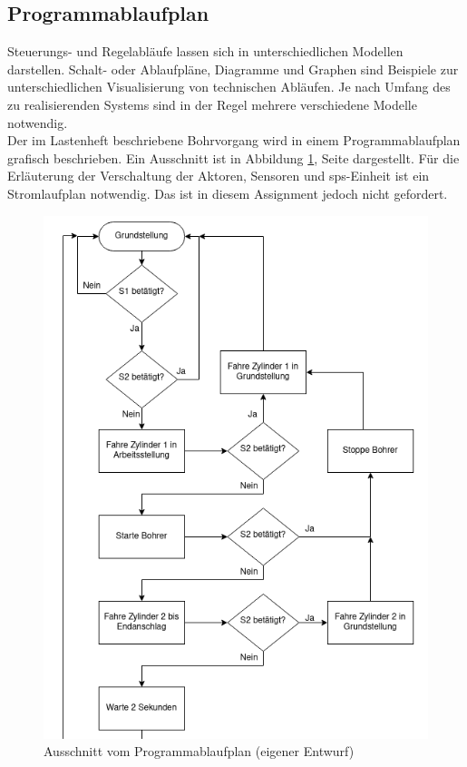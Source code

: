 \subsection{Programmablaufplan}
Steuerungs- und Regelabläufe lassen sich in unterschiedlichen Modellen darstellen. Schalt- oder Ablaufpläne, Diagramme und Graphen sind Beispiele zur unterschiedlichen Visualisierung von technischen Abläufen. Je nach Umfang des zu realisierenden Systems sind in der Regel mehrere verschiedene Modelle notwendig.\autocite[vgl.][1446]{Boege2021}\\
Der im Lastenheft beschriebene Bohrvorgang wird in einem Programmablaufplan grafisch beschrieben. Ein Ausschnitt ist in Abbildung \ref{fig:Ausschnitt_pap}, Seite \pageref{fig:Ausschnitt_pap} dargestellt. Für die Erläuterung der Verschaltung der Aktoren, Sensoren und \ac{sps}-Einheit ist ein Stromlaufplan notwendig. Das ist in diesem Assignment jedoch nicht gefordert.\\
\begin{figure}[H]
   \centering
    \includegraphics[scale=0.75]{Bilder/Flow_Chart_Bohrvorrichtung_Ausschnitt.png}
    \caption[Ausschnitt Programmablaufplan]{Ausschnitt vom Programmablaufplan (eigener Entwurf)}
    \label{fig:Ausschnitt_pap}
\end{figure}
